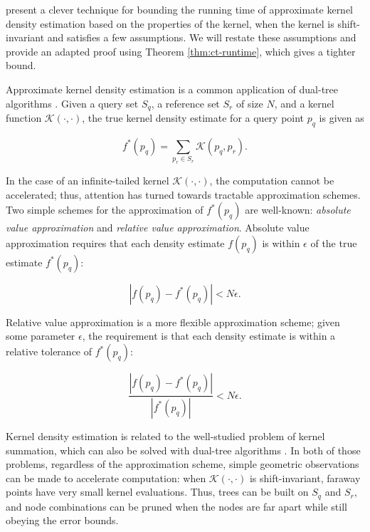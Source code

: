 \citet{ram2009} present a clever technique for bounding the
running time of approximate kernel density estimation based on the properties of
the kernel, when the kernel is shift-invariant and satisfies a few assumptions.
We will restate these assumptions and provide an adapted proof using Theorem
\ref{thm:ct-runtime}, which gives a tighter bound.

Approximate kernel density estimation is a common application of dual-tree
algorithms \citep{gray2003nonparametric, nbody}.  Given a query set $S_q$, a
reference set $S_r$ of size $N$, and a kernel function $\mathcal{K}(\cdot,
\cdot)$, the true kernel density estimate for a query point $p_q$ is given as

\begin{equation}
f^*(p_q) = \sum_{p_r \in S_r} \mathcal{K}(p_q, p_r).
\end{equation}

In the case of an infinite-tailed kernel $\mathcal{K}(\cdot, \cdot)$, the
computation cannot be accelerated; thus, attention has turned towards tractable
approximation schemes.  Two simple schemes for the approximation of $f^*(p_q)$
are well-known: {\it absolute value approximation} and {\it relative value
approximation}.  Absolute value approximation requires that each density
estimate $f(p_q)$ is within $\epsilon$ of the true estimate $f^*(p_q)$:

\begin{equation}
| f(p_q) - f^*(p_q) | < N \epsilon.
\end{equation}

Relative value approximation is a more flexible approximation scheme; given some
parameter $\epsilon$, the requirement is that each density estimate is within a
relative tolerance of $f^*(p_q):$

\begin{equation}
\frac{| f(p_q) - f^*(p_q) |}{| f^*(p_q) |} < N \epsilon.
\end{equation}

Kernel density estimation is related to the well-studied problem of kernel
summation, which can also be solved with dual-tree algorithms
\citep{lee2006faster, lee2008fast}.  In both of those problems, regardless of
the approximation scheme, simple geometric observations can be made to
accelerate computation: when $\mathcal{K}(\cdot, \cdot)$ is shift-invariant,
faraway points have very small kernel evaluations.  Thus, trees can be built on
$S_q$ and $S_r$, and node combinations can be pruned when the nodes are far
apart while still obeying the error bounds.

